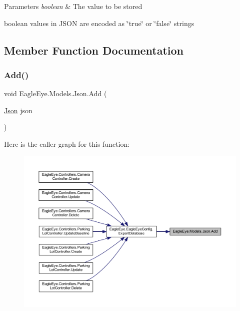 \begin{DoxyParams}{Parameters}
{\em boolean} & The value to be stored\\
\hline
\end{DoxyParams}


boolean values in J\+S\+ON are encoded as \char`\"{}true\char`\"{} or \char`\"{}false\char`\"{} strings

\subsection{Member Function Documentation}
\mbox{\label{class_eagle_eye_1_1_models_1_1_json_a4b23b3ec238276219d3d953b385fac93}} 
\subsubsection{\texorpdfstring{Add()}{Add()}}
{\footnotesize\ttfamily void Eagle\+Eye.\+Models.\+Json.\+Add (\begin{DoxyParamCaption}\item[{\mbox{\hyperlink{class_eagle_eye_1_1_models_1_1_json}{Json}}}]{json }\end{DoxyParamCaption})}





Here is the caller graph for this function\+:\nopagebreak
\begin{figure}[H]
\begin{center}
\leavevmode
\includegraphics[width=350pt]{class_eagle_eye_1_1_models_1_1_json_a4b23b3ec238276219d3d953b385fac93_icgraph}
\end{center}
\end{figure}
\mbox{\label{class_eagle_eye_1_1_models_1_1_json_a140f24f32b5b39c66584f13eb2fbf586}} 
